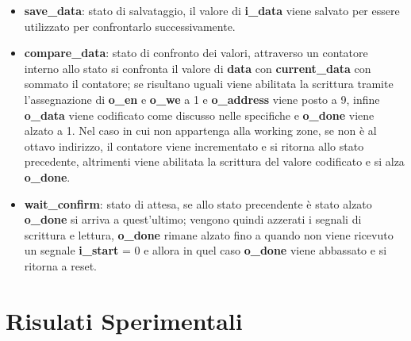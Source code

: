 \documentclass[12pt]{article}
\begin{document}
\begin{itemize}
{          }
    \item \textbf{save\_data}: stato di salvataggio, il valore di \textbf{i\_data} viene salvato per essere utilizzato per confrontarlo successivamente.
    \item \textbf{compare\_data}: stato di confronto dei valori, attraverso un contatore interno allo stato si confronta il valore di \textbf{data} con \textbf{current\_data} con sommato il contatore; se risultano uguali viene abilitata la scrittura tramite l'assegnazione di \textbf{o\_en} e \textbf{o\_we} a 1 e \textbf{o\_address} viene posto a 9, infine \textbf{o\_data} viene codificato come discusso nelle specifiche e \textbf{o\_done} viene alzato a 1. Nel caso in cui non appartenga alla working zone, se non è al ottavo indirizzo, il contatore viene incrementato e si ritorna allo stato precedente, altrimenti viene abilitata la scrittura  del valore codificato  e si alza \textbf{o\_done}.
    \item \textbf{wait\_confirm}: stato di attesa, se allo stato precendente è stato alzato \textbf{o\_done} si arriva a quest'ultimo; vengono quindi azzerati i segnali di scrittura e lettura, \textbf{o\_done} rimane alzato fino a quando non viene ricevuto un segnale \textbf{i\_start} = 0 e allora in quel caso \textbf{o\_done} viene abbassato e si ritorna a reset.
\end{itemize}
\section{Risulati Sperimentali}
\end{document}
